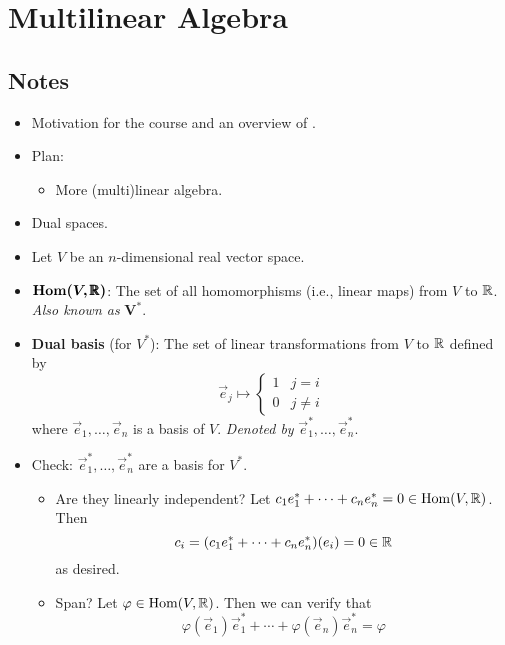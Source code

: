 \documentclass[../notes.tex]{subfiles}
\begin{document}
\chapter{Multilinear Algebra}
\section{Notes}
\begin{itemize}
    \item {}Motivation for the course and an overview of \textcite{bib:DifferentialForms}.
    \item {}Plan:
    \begin{itemize}
        \item More (multi)linear algebra.
    \end{itemize}
    \item Dual spaces.
    \item Let $V$ be an $n$-dimensional real vector space.
    \item $\bm{\Hom(V,\pmb{\R})}$: The set of all homomorphisms (i.e., linear maps) from $V$ to $\mathbb{R}$. \emph{Also known as} $\bm{V^*}$.
    \item \textbf{Dual basis} (for $V^*$): The set of linear transformations from $V$ to $\mathbb{R}$ defined by
    \begin{equation*}
        \vec{e}_j \mapsto
        \begin{cases}
            1 & j=i\\
            0 & j\neq i
        \end{cases}
    \end{equation*}
    where $\vec{e}_1,\dots,\vec{e}_n$ is a basis of $V$. \emph{Denoted by} $\vec{e}_1^*,\dots,\vec{e}_n^*$.
    \item Check: $\vec{e}_1^*,\dots,\vec{e}_n^*$ are a basis for $V^*$.
    \begin{itemize}
        \item Are they linearly independent? Let $c_1e_1^*+\cdots+c_ne_n^*=0\in\operatorname{Hom}(V,\mathbb{R})$. Then
        \begin{equation*}
            c_i = (c_1e_1^*+\cdots+c_ne_n^*)(e_i) = 0\in\mathbb{R}
        \end{equation*}
        as desired.
        \item Span? Let $\varphi\in\operatorname{Hom}(V,\mathbb{R})$. Then we can verify that
        \begin{equation*}
            \varphi(\vec{e}_1)\vec{e}_1^*+\cdots+\varphi(\vec{e}_n)\vec{e}_n^* = \varphi

\end{equation*}
\end{itemize}
\end{itemize}
\end{document}
